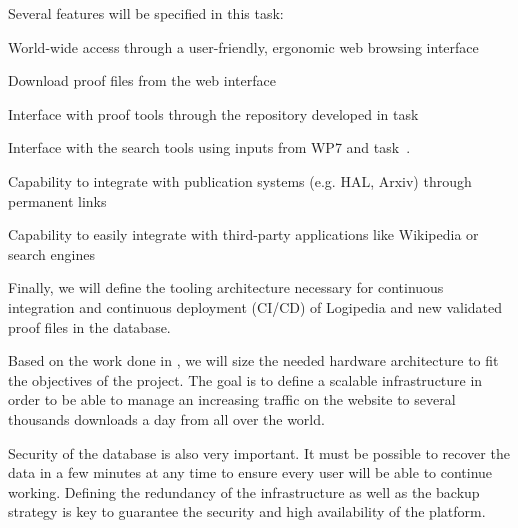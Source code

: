 \begin{workpackage}[id=access,wphases=0-48,type=MGT,
  short=Access,%
  title={Access to the infrastructure},
  lead=Irt,IrtRM=23,OcaRM=6,EduRM=12,InrRM=18]
\begin{tasklist}
\begin{task}[id=archi,
      title=Defining the functional and software architecture,
      lead=Irt,IrtRM=3]
    Several features will be specified in this task:
    \begin{compactitem}
    \item World-wide access through a user-friendly, ergonomic web
      browsing interface
    \item Download proof files from the web interface
    \item Interface with proof tools through the repository developed
      in task~
    \item Interface with the search tools using inputs from WP7 and
      task~.
    \item Capability to integrate with publication systems (e.g. HAL,
      Arxiv) through permanent links
    \item Capability to easily integrate with third-party applications
      like Wikipedia or search engines
    \end{compactitem}

    Finally, we will define the tooling architecture necessary for
    continuous integration and continuous deployment (CI/CD) of
    Logipedia and new validated proof files in the database.
  \end{task}

  \begin{task}[id=infra,
      title=Defining the hardware architecture for the infrastructure,
      lead=Irt,IrtRM=1]
    Based on the work done in , we will
    size the needed hardware architecture to fit the objectives of the
    project. The goal is to define a scalable infrastructure in order
    to be able to manage an increasing traffic on the website to
    several thousands downloads a day from all over the world.

    Security of the database is also very important. It must be
    possible to recover the data in a few minutes at any time to
    ensure every user will be able to continue working. Defining the
    redundancy of the infrastructure as well as the backup strategy is
    key to guarantee the security and high availability of the
    platform.


\end{task}
\end{tasklist}
\end{workpackage}
